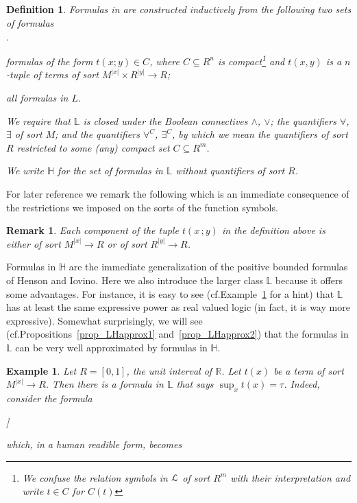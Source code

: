 \documentclass[11pt,oneside]{amsart}
\newcommand{\mylabel}[1]{{#1}\hfill}
\renewenvironment{itemize}
  {\begin{list}{$\cdot$}{%
   \setlength{\parskip}{0mm}
   \setlength{\topsep}{.2\baselineskip}
   \setlength{\rightmargin}{0mm}
   \setlength{\listparindent}{0mm}
   \setlength{\itemindent}{0mm}
   \setlength{\labelwidth}{3ex}
   \setlength{\itemsep}{.2\baselineskip}
   \setlength{\parsep}{.2\baselineskip}
   \setlength{\partopsep}{0mm}
   \setlength{\labelsep}{1ex}
   \setlength{\leftmargin}{\labelwidth+\labelsep}
   \let\makelabel\mylabel}}{%
   \end{list}}
\theoremstyle{plain}
\newtheorem{definition}[theorem]{Definition}
\newtheorem{example}[theorem]{Example}
\newtheorem{remark}[theorem]{Remark}
\theoremstyle{remark}
\renewcommand*{\emph}[1]{%
   \smash{\tikz[baseline]\node[rectangle, fill=olive!25, rounded corners, inner xsep=0.5ex, inner ysep=0.2ex, anchor=base, minimum height = 2.7ex]{#1};}}
\begin{document}
\begin{definition}\label{def_LL}
  Formulas in \emph{$\mathds{L}$\/} are constructed inductively from the following two sets of formulas
  \begin{itemize}
  \item[i.] formulas of the form $t(x;y)\in C$, where $C\subseteq R^n$ is compact\footnote{We confuse the relation symbols in ${\EuScript L}$ of sort $R^m$ with their interpretation and write $t\in C$ for $C(t)$} and $t(x,y)$ is a $n$-tuple of terms of sort $M^{|x|}\times R^{|y|}\to R$; 
  \item[ii.] all formulas in $L$.
  \end{itemize}
  We require that $\mathds{L}$ is closed under the Boolean connectives $\wedge$, $\vee$; the quantifiers $\forall$, $\exists$ of sort $M$; and the quantifiers $\forall^C$, $\exists^C$, by which we mean the quantifiers of sort $R$ restricted to some (any) compact set $C\subseteq R^m$.

  We write $\mathds{H}$ for the set of formulas in $\mathds{L}$ without quantifiers of sort $R$.
\end{definition}

For later reference we remark the following which is an immediate consequence of the restrictions we imposed on the sorts of the function symbols.

\begin{remark}\label{rk_terms}
   Each component of the tuple $t(x\,;y)$ in the definition above is either of sort $M^{|x|}\to R$ or of sort $R^{|y|}\to R$.\hfill\qedsymbol
\end{remark}

\noindent\llap{\textcolor{red}{\Large\dangersign}\kern1ex}\ignorespaces
Formulas in $\mathds{H}$ are the immediate generalization of the positive bounded formulas of Henson and Iovino.
Here we also introduce the larger class $\mathds{L}$ because it offers some advantages. 
For instance, it is easy to see (cf.\@ Example~\ref{ex_Rvlogic} for a hint) that $\mathds{L}$ has at least the same expressive power as real valued logic (in fact, it is way more expressive).
Somewhat surprisingly, we will see (cf.\@ Propositions~\ref{prop_LHapprox1} and~\ref{prop_LHapprox2}) that the formulas in $\mathds{L}$ can be very well approximated by formulas in $\mathds{H}$.

\begin{example}\label{ex_Rvlogic}
  Let $R=[0,1]$, the unit interval of $\mathds{R}$.
  Let $t(x)$ be a term of sort $M^{|x|}\to R$.
  Then there is a formula in $\mathds{L}$ that says $\sup_{x} t(x)=\tau$.
  Indeed, consider the formula

  {\wedge}{\forall\varepsilon \Big[\varepsilon\in\{0\}\ \vee\ \exists x\ \big[\big(\tau\dotminus t(x)\big)\dotminus\varepsilon\in\{0\}\big]\Big]}

  which, in a human readible form, becomes

  \hfill\qedsymbol
\end{example}
\end{document}
